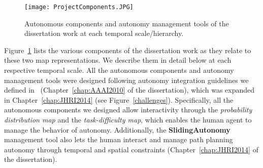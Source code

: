 
\begin{figure}
\centering
\texttt{[image: ProjectComponents.JPG]}
\caption{Autonomous components and autonomy management tools of the dissertation work at each temporal scale/hierarchy.}
\label{ProjectComponents}
\end{figure}

Figure~\ref{ProjectComponents} lists the various components of the dissertation work as they relate to these two map representations. We describe them in detail below at each respective temporal scale. All the autonomous components and autonomy management tools were designed following autonomy integration guidelines we defined in~\cite{Lin2010Supporting} (Chapter~\ref{chap:AAAI2010} of the dissertation), which was expanded in Chapter~\ref{chap:JHRI2014} (see Figure~\ref{challenges}). Specifically, all the autonomous components we designed allow interactivity through the \textit{probability distribution map} and the \textit{task-difficulty map}, which enables the human agent to manage the behavior of autonomy. Additionally, the \textbf{SlidingAutonomy} management tool also lets the human interact and manage path planning autonomy through temporal and spatial constraints (Chapter~\ref{chap:JHRI2014} of the dissertation).

